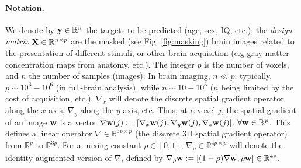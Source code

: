 \paragraph{Notation.} We denote by ${\mathbf{y}} \in \mathbb{R}^{n}$ the targets to
be predicted (age, sex, IQ, etc.); the \textit{design matrix}
${\mathbf{X}}\in\mathbb{R}^{n \times p}$ are the masked (see Fig. \ref{fig:masking})
brain images related to the presentation of different
stimuli, or other brain acquisition (e.g gray-matter concentration
maps from anatomy, etc.). The integer $p$ is the number of voxels,
and $n$ the number of samples (images). In brain imaging, $n \ll p$;
typically, $p \sim 10^3-10^6$ (in full-brain analysis),
while $n \sim 10-10^3$ ($n$ being limited by the cost of acquisition,
etc.). $\nabla_x$ will denote the discrete spatial gradient operator
along the $x$-axis, $\nabla_y$ along the $y$-axis, etc.
Thus, at a voxel $j$, the spatial gradient of an image $\mathbf{w}$ is a vector ${\nabla} {\mathbf{w}}(j) := [\nabla_{x} {\mathbf{w}}(j), \nabla_{y} {\mathbf{w}}(j), \nabla_{z} {\mathbf{w}}(j)]$, $\forall \mathbf{w} \in \mathbb R^p$.
This defines a linear operator $\nabla \in \mathbb R^{3p \times p}$ (the discrete 3D spatial gradient operator) from $\mathbb R^p$ to $\mathbb R^{3p}$. For a mixing constant $\rho \in [0, 1]$, $\nabla_\rho \in \mathbb R^{4p \times p}$ will denote the identity-augmented version of $\nabla$, defined by ${\nabla_\rho} {\mathbf{w}} := [(1-\rho)\nabla \mathbf{w}, \rho \mathbf{w}] \in \mathbb R^{4p}$.


